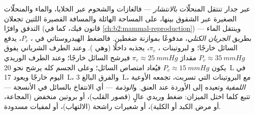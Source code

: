 \begin{proposition}\label{prop:b2:blood-circulation:exchange}
عبر جدار  تنتقل المنحلّات \emph{بالانتشار} --- فالغازات
والشحوم عبر الخلايا، والماء والمنحلّات الصغيرة عبر
الشقوق بينها، على المساحة الهائلة والمسافة القصيرة
اللتين تجعلان التدفق وافرًا (قانون فيك، كما في 
\cref{ch:b2:mammal-reproduction}) --- وينتقل الماء
بطريق \emph{الجريان الكتلي}، مدفوعًا بموازنة ضغطين. فالضغط
الهيدروستاتي في ، $P_c$، يدفع السائل خارجًا؛ و
 لبروتينات ، $\pi_c$، يجذبه داخلًا
(وهي \emph{}). وعند الطرف الشرياني يفوق $P_c \approx
\qty{35}{mmHg}$ مقدارَ $\pi_c \approx \qty{25}{mmHg}$ فيرشح
السائل خارجًا؛ وعند الطرف الوريدي يكون $P_c \approx \qty{15}{mmHg}$ فيُعاد
امتصاص السائل؛ وعلى الجسم كله يرشح نحو \qty{20}{L} في اليوم
خارجًا ويعود \qty{17}{L}، والفرق البالغ \qty{3}{L}، مع
البروتينات التي تسربت، تجمعه الأوعية \emph{اللمفية}
وتعيده إلى الأوردة عند العنق. و\emph{الوذمة} --- أي الانتفاخ
بالسائل في الأنسجة --- تتبع كلما اختل الميزان:
ضغط وريدي عالٍ (قصور القلب)، أو بروتين  منخفض
(المجاعة، أو مرض الكبد أو الكلية)، أو شعيرات راشحة
(الالتهاب)، أو لمفيات مسدودة.
\end{proposition}

